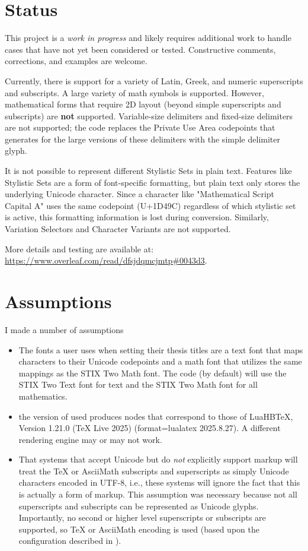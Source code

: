 \documentclass{article}
\begin{document}
\section{Status}
\label{sec:status}

This project is a \textit{work in progress} and likely requires additional work to handle cases that have not yet been considered or tested. Constructive comments, corrections, and examples are welcome.

Currently, there is support for a variety of Latin, Greek, and numeric superscripts and subscripts. A large variety of math symbols is supported. However, mathematical forms that require 2D layout (beyond simple superscripts and subscripts) are \textbf{not} supported. Variable-size delimiters and fixed-size delimiters are not supported; the code replaces the Private Use Area codepoints that \LuaLaTeX{} generates for the large versions of these delimiters with the simple delimiter glyph.

It is not possible to represent different Stylistic Sets in plain text. Features like Stylistic Sets are a form of font-specific formatting, but plain text only stores the underlying Unicode character. Since a character like "Mathematical Script Capital A" uses the same codepoint (U+1D49C) regardless of which stylistic set is active, this formatting information is lost during conversion. Similarly, Variation Selectors and Character Variants are not supported.

More details and testing are available at:  \url{https://www.overleaf.com/read/dfsjdqmcjmtp#0043d3}.

\section{Assumptions}
\label{sec:asumptions}
I made a number of assumptions
\begin{itemize}
    \item The fonts a user uses when setting their thesis titles are a text font that maps characters to their Unicode codepoints and a math font that utilizes the same mappings as the STIX Two Math font. The code (by default) will use the STIX Two Text font for text and the STIX Two Math font for all mathematics.

    \item the version of \LuaLaTeX{} used produces nodes that correspond to those of LuaHBTeX, Version 1.21.0 (TeX Live 2025)  (format=lualatex 2025.8.27). A different rendering engine may or may not work.

    \item That systems that accept Unicode but do \textit{not} explicitly support markup will treat the \TeX{} or AsciiMath subscripts and superscripts as simply Unicode characters encoded in UTF-8, i.e., these systems will ignore the fact that this is actually a form of markup. This assumption was necessary because not all superscripts and subscripts can be represented as Unicode glyphs. Importantly, no second or higher level superscripts or subscripts are supported, so \TeX{} or AsciiMath encoding is used (based upon the configuration described in ).
\end{itemize}
\end{document}
